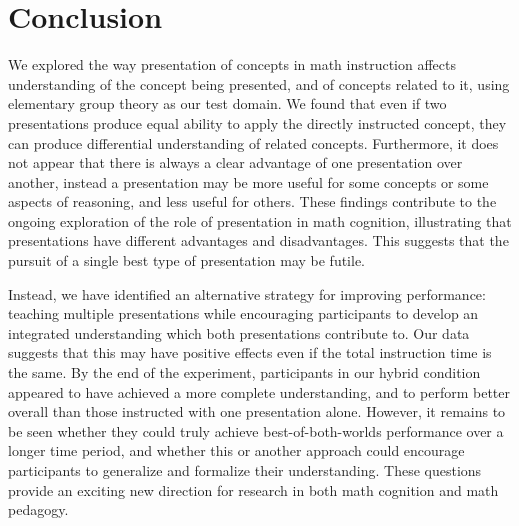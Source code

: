 \documentclass[man,10pt]{apa6}
\begin{document}
\section{Conclusion}
We explored the way presentation of concepts in math instruction affects understanding of the concept being presented, and of concepts related to it, using elementary group theory as our test domain. We found that even if two presentations produce equal ability to apply the directly instructed concept, they can produce differential understanding of related concepts. Furthermore, it does not appear that there is always a clear advantage of one presentation over another, instead a presentation may be more useful for some concepts or some aspects of reasoning, and less useful for others. These findings contribute to the ongoing exploration of the role of presentation in math cognition, illustrating that presentations have different advantages and disadvantages. This suggests that the pursuit of a single best type of presentation may be futile. \par
Instead, we have identified an alternative strategy for improving performance: teaching multiple presentations while encouraging participants to develop an integrated understanding which both presentations contribute to. Our data suggests that this may have positive effects even if the total instruction time is the same. By the end of the experiment, participants in our hybrid condition appeared to have achieved a more complete understanding, and to perform better overall than those instructed with one presentation alone. However, it remains to be seen whether they could truly achieve best-of-both-worlds performance over a longer time period, and whether this or another approach could encourage participants to generalize and formalize their understanding. These questions provide an exciting new direction for research in both math cognition and math pedagogy.  
 





\setcounter{secnumdepth}{-1}
\clearpage
\end{document}
